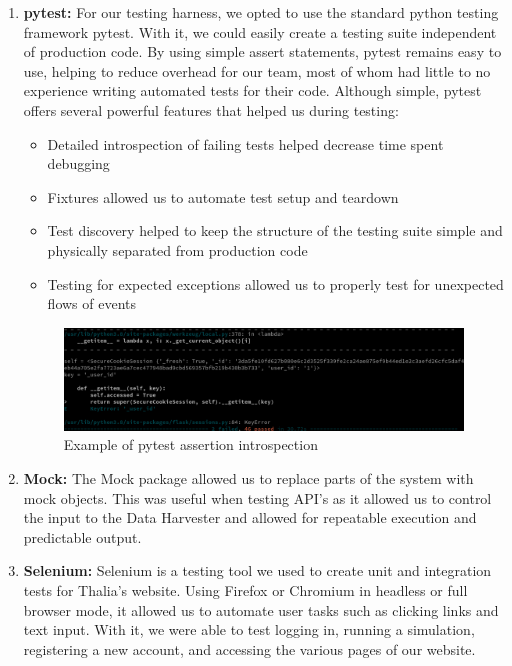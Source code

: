 \documentclass[main.tex]{subfiles}
\begin{document}
\begin{enumerate}
\item \textbf{pytest:} For our testing harness, we opted to use the standard python testing framework pytest. With it, we could easily create a testing suite independent of production code. By using simple assert statements, pytest remains easy to use, helping to reduce overhead for our team, most of whom had little to no experience writing automated tests for their code. Although simple, pytest offers several powerful features that helped us during testing:

\begin{itemize}
\item Detailed introspection of failing tests helped decrease time spent debugging
\item Fixtures allowed us to automate test setup and teardown
\item Test discovery helped to keep the structure of the testing suite simple and physically separated from production code
\item Testing for expected exceptions allowed us to properly test for unexpected flows of events
\end{itemize}


\begin{figure}[H]
   \centering
   \includegraphics[scale=0.3]{06Testing/06Pictures/failedTest.png}
   \caption{Example of pytest assertion introspection}
   \label{Pytest example}
\end{figure}

\item \textbf{Mock:} The Mock \cite{mock} package allowed us to replace parts of the system with mock objects. This was useful when testing API’s as it allowed us to control the input to the Data Harvester and allowed for repeatable execution and predictable output.

\item \textbf{Selenium:} Selenium \cite{selenium} is a testing tool we used to create unit and integration tests for Thalia’s website. Using Firefox or Chromium in headless or full browser mode, it allowed us to automate user tasks such as clicking links and text input. With it, we were able to test logging in, running a simulation, registering a new account, and accessing the various pages of our website.


\end{enumerate}
\end{document}
